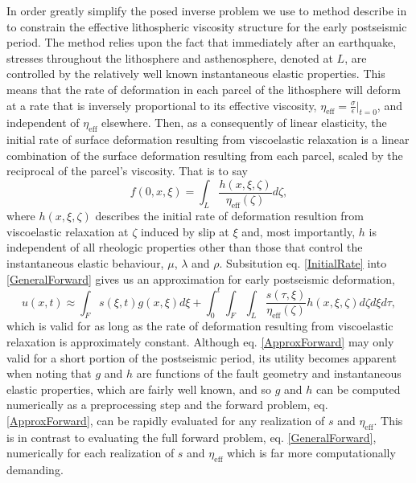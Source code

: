 \documentclass[12pt]{article}
\begin{document}
In order greatly simplify the posed inverse problem we use to method describe in \cite{Hines2015} to constrain the effective lithospheric viscosity structure for the early postseismic period.  The method relies upon the fact that immediately after an earthquake, stresses throughout the lithosphere and asthenosphere, denoted at $L$, are controlled by the relatively well known instantaneous elastic properties.  This means that the rate of deformation in each parcel of the lithosphere will deform at a rate that is inversely proportional to its effective viscosity, $\eta_{\mathrm{eff}}=\frac{\sigma}{\dot{\epsilon}}|_{t=0}$, and independent of $\eta_{\mathrm{eff}}$ elsewhere. Then, as a consequently of linear elasticity, the initial rate of surface deformation resulting from viscoelastic relaxation is a linear combination of the surface deformation resulting from each parcel, scaled by the reciprocal of the parcel's viscosity. That is to say   
\begin{equation}\label{InitialRate}
  f(0,x,\xi) = \int_L \frac{h(x,\xi,\zeta)}{\eta_\mathrm{eff}(\zeta)} d\zeta, 
\end{equation}
where $h(x,\xi,\zeta)$ describes the initial rate of deformation resultion from viscoelastic relaxation at $\zeta$ induced by slip at $\xi$ and, most importantly, $h$ is independent of all rheologic properties other than those that control the instantaneous elastic behaviour, $\mu$, $\lambda$ and $\rho$. Subsitution eq. \ref{InitialRate} into \ref{GeneralForward} gives us an approximation for early postseismic deformation,
\begin{equation}\label{ApproxForward}
  u(x,t) \approx \int_F s(\xi,t)g(x,\xi)d\xi + 
           \int_0^t\int_F\int_L \frac{s(\tau,\xi)}{\eta_\mathrm{eff}(\zeta)} h(x,\xi,\zeta) d\zeta d\xi d\tau,
\end{equation}
which is valid for as long as the rate of deformation resulting from viscoelastic relaxation is approximately constant. Although eq. \ref{ApproxForward} may only valid for a short portion of the postseismic period, its utility becomes apparent when noting that $g$ and $h$ are functions of the fault geometry and instantaneous elastic properties, which are fairly well known, and so $g$ and $h$ can be computed numerically as a preprocessing step and the forward problem, eq. \ref{ApproxForward}, can be rapidly evaluated for any realization of $s$ and $\eta_{\mathrm{eff}}$.  This is in contrast to evaluating the full forward problem, eq. \ref{GeneralForward}, numerically for each realization of $s$ and $\eta_{\mathrm{eff}}$ which is far more computationally demanding.   
\end{document}
